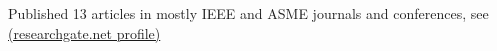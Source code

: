 \item Published 13 articles in mostly IEEE and ASME journals and conferences, 
see \href{https://www.researchgate.net/profile/Kiron_Mateti}{(researchgate.net profile)} 